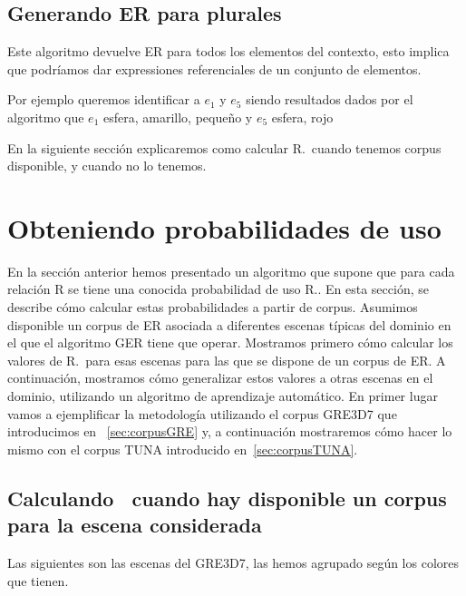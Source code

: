 \subsection{Generando ER para plurales}

Este algoritmo devuelve ER para todos los elementos del contexto, 
esto implica que podr\'iamos dar expressiones referenciales de un conjunto de elementos.

Por ejemplo queremos identificar a $e_1$ y $e_5$ 
siendo resultados dados por el algoritmo que $e_1$
esfera, amarillo, peque\~no
y $e_5$ esfera, rojo


En la siguiente secci\'on explicaremos como calcular R.\puse\ cuando tenemos corpus disponible, y cuando no lo tenemos.

\section{Obteniendo probabilidades de uso}

\label{sec:learning}

En la secci\'on anterior hemos presentado un algoritmo que supone que para
cada relaci\'on R se tiene una conocida
probabilidad de uso R.\puse. En esta secci\'on, se describe c\'omo
calcular estas probabilidades a partir de corpus. Asumimos disponible un corpus de ER asociada a diferentes
escenas t\'{i}picas del dominio en el que el algoritmo GER tiene que operar. Mostramos primero c\'omo calcular los valores de R.\puse\ para
esas escenas para las que se dispone de un corpus de ER. A continuaci\'on, mostramos c\'omo
generalizar estos valores a otras escenas en el dominio, utilizando un
algoritmo de aprendizaje autom\'atico. En primer lugar vamos a ejemplificar la
metodolog\'{i}a utilizando el corpus GRE3D7 que introducimos en ~\ref{sec:corpusGRE} y, a continuaci\'on mostraremos c\'omo hacer lo mismo con el corpus TUNA introducido en~\ref{sec:corpusTUNA}.


\subsection{Calculando \puse\ cuando hay disponible un corpus para la escena considerada}

Las siguientes son las escenas del GRE3D7, las hemos agrupado seg\'un los colores que tienen.

